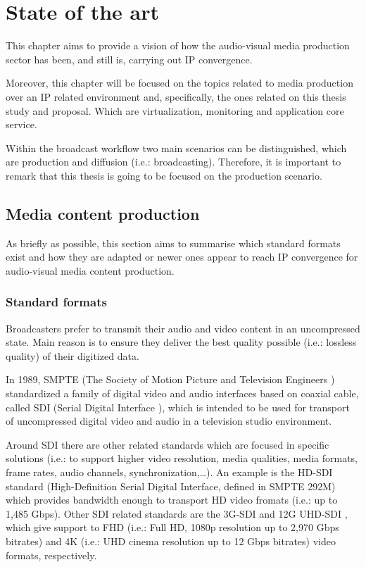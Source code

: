 \chapter{State of the art}\label{A:stateOfTheArt}

This chapter aims to provide a vision of how the audio-visual media production sector has been, and still is, carrying out IP convergence. 

Moreover, this chapter will be focused on the topics related to media production over an IP related environment and, specifically, the ones related on this thesis study and proposal. Which are virtualization, monitoring and application core service.

Within the broadcast workflow two main scenarios can be distinguished, which are production and diffusion (i.e.: broadcasting). Therefore, it is important to remark that this thesis is going to be focused on the production scenario.

\section{Media content production}

As briefly as possible, this section aims to summarise which standard formats exist and how they are adapted or newer ones appear to reach IP convergence for audio-visual media content production.

\subsection{Standard formats}

Broadcasters prefer to transmit their audio and video content in an uncompressed state. Main reason is to ensure they deliver the best quality possible (i.e.: lossless quality) of their digitized data. 

In 1989, SMPTE (The Society of Motion Picture and Television Engineers \cite{smpte}) standardized a family of digital video and audio interfaces based on coaxial cable, called SDI (Serial Digital Interface \cite{SDI}), which is intended to be used for transport of uncompressed digital video and audio in a television studio environment. 

Around SDI there are other related standards which are focused in specific solutions (i.e.: to support higher video resolution, media qualities, media formats, frame rates, audio channels, synchronization,\ldots). An example is the HD-SDI \cite{SDI} standard (High-Definition Serial Digital Interface, defined in SMPTE 292M) which provides bandwidth enough to transport HD video fromats (i.e.: up to 1,485 Gbps). Other SDI related standards are the 3G-SDI \cite{3GSDI} and 12G UHD-SDI \cite{UHDSDI}, which give support to FHD (i.e.: Full HD, 1080p resolution up to 2,970 Gbps bitrates) and 4K (i.e.: UHD cinema resolution up to 12 Gbps bitrates) video formats, respectively. 

